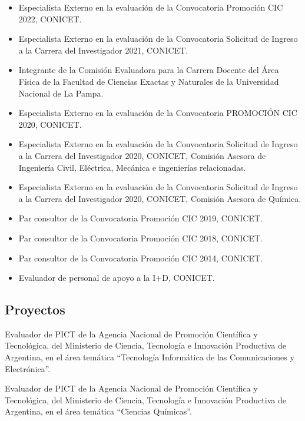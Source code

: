 \begin{itemize} \setlength\itemsep{-0.25em}
    \item {} Especialista Externo en la evaluación de la Convocatoria Promoción CIC 2022, CONICET.
    \item {} Especialista Externo en la evaluación de la Convocatoria Solicitud de Ingreso a la Carrera del Investigador 2021, CONICET.
    \item {} Integrante de la Comisión Evaluadora para la Carrera Docente del Área Física de la Facultad de Ciencias Exactas y Naturales de la Universidad Nacional de La Pampa.
    \item Especialista Externo en la evaluación de la Convocatoria PROMOCIÓN CIC 2020, CONICET.
    \item {} Especialista Externo en la evaluación de la Convocatoria Solicitud de Ingreso a la Carrera del Investigador 2020, CONICET, Comisión Asesora de Ingeniería Civil, Eléctrica, Mecánica e ingenierías relacionadas.
    \item Especialista Externo en la evaluación de la Convocatoria Solicitud de Ingreso a la Carrera del Investigador 2020, CONICET, Comisión Asesora de Química.
    \item {} Par consultor de la Convocatoria Promoción CIC 2019, CONICET.
    \item {} Par consultor de la Convocatoria Promoción CIC 2018, CONICET.
    \item {} Par consultor de la Convocatoria Promoción CIC 2014, CONICET.
    \item {} Evaluador de personal de apoyo a la I+D, CONICET.
\end{itemize}

\subsection{Proyectos}

 Evaluador de PICT de la Agencia Nacional de Promoción Científica y Tecnológica, del Ministerio de Ciencia, Tecnología e Innovación Productiva de Argentina, en el área temática ``Tecnología Informática de las Comunicaciones y Electrónica''.

 Evaluador de PICT de la Agencia Nacional de Promoción Científica y Tecnológica, del Ministerio de Ciencia, Tecnología e 
Innovación Productiva de Argentina, en el área temática ``Ciencias Químicas''.

